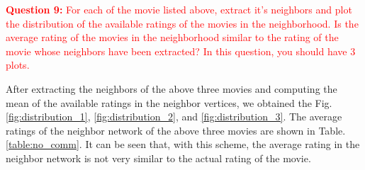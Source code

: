 \documentclass[11pt]{article}
\begin{document}
\textcolor{red}{\textbf{Question 9:} For each of the movie listed above, extract it's neighbors and plot the distribution of the available ratings of the movies in the neighborhood. Is the average rating of the movies in the neighborhood similar to the rating of the movie whose neighbors have been extracted? In this question, you should have $3$ plots.}

After extracting the neighbors of the above three movies and computing the mean of the available ratings in the neighbor vertices, we obtained the Fig. \ref{fig:distribution_1}, \ref{fig:distribution_2}, and \ref{fig:distribution_3}. The average ratings of the neighbor network of the above three movies are shown in Table. \ref{table:no_comm}. It can be seen that, with this scheme, the average rating in the neighbor network is not very similar to the actual rating of the movie.

\begin{table}[H]
\center
\caption{Average rating vs. actual rating of the three movies}
\label{table:no_comm}
\end{table}
\end{document}
